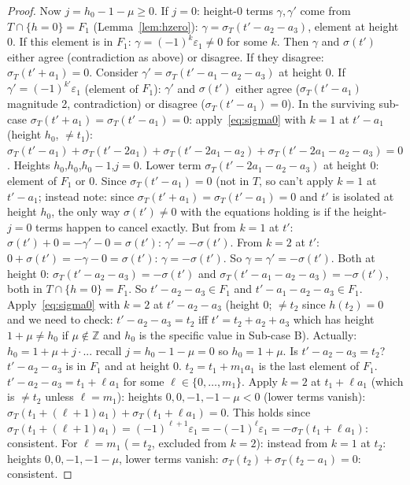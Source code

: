 \documentclass{article}
\begin{document}
\begin{proof}
Now $j=h_0-1-\mu\ge 0$.  If $j=0$: height-$0$ terms $\gamma,\gamma'$ come from $T\cap\{h=0\}=F_1$ (Lemma~\ref{lem:hzero}):
$\gamma=\sigma_T(t'-a_2-a_3)$, element at height $0$.  If this element is in $F_1$: $\gamma=(-1)^k\varepsilon_1\ne 0$ for some $k$.
Then $\gamma$ and $\sigma(t')$ either agree (contradiction as above) or disagree.
If they disagree: $\sigma_T(t'+a_1)=0$.  Consider $\gamma'=\sigma_T(t'-a_1-a_2-a_3)$ at height $0$.
If $\gamma'=(-1)^{k'}\varepsilon_1$ (element of $F_1$): $\gamma'$ and $\sigma(t')$ either agree ($\sigma_T(t'-a_1)$ magnitude 2, contradiction) or disagree ($\sigma_T(t'-a_1)=0$).
In the surviving sub-case $\sigma_T(t'+a_1)=\sigma_T(t'-a_1)=0$:
apply~\eqref{eq:sigma0} with $k=1$ at $t'-a_1$ (height $h_0$, $\ne t_1$):
$\sigma_T(t'-a_1)+\sigma_T(t'-2a_1)+\sigma_T(t'-2a_1-a_2)+\sigma_T(t'-2a_1-a_2-a_3)=0$.
Heights $h_0$,$h_0$,$h_0-1$,$j=0$.
Lower term $\sigma_T(t'-2a_1-a_2-a_3)$ at height $0$: element of $F_1$ or $0$.
Since $\sigma_T(t'-a_1)=0$ (not in $T$, so can't apply $k=1$ at $t'-a_1$; instead note: since
$\sigma_T(t'+a_1)=\sigma_T(t'-a_1)=0$ and $t'$ is isolated at height $h_0$, the only way
$\sigma(t')\ne 0$ with the equations holding is if the height-$j=0$ terms happen to cancel exactly.
But from $k=1$ at $t'$: $\sigma(t')+0 = -\gamma'-0 = \sigma(t')$: $\gamma'=-\sigma(t')$.
From $k=2$ at $t'$: $0+\sigma(t')=-\gamma-0=\sigma(t')$: $\gamma=-\sigma(t')$.
So $\gamma=\gamma'=-\sigma(t')$.  Both at height $0$: $\sigma_T(t'-a_2-a_3)=-\sigma(t')$ and
$\sigma_T(t'-a_1-a_2-a_3)=-\sigma(t')$, both in $T\cap\{h=0\}=F_1$.
So $t'-a_2-a_3\in F_1$ and $t'-a_1-a_2-a_3\in F_1$.
Apply~\eqref{eq:sigma0} with $k=2$ at $t'-a_2-a_3$ (height $0$; $\ne t_2$ since $h(t_2)=0$
and we need to check: $t'-a_2-a_3=t_2$ iff $t'=t_2+a_2+a_3$ which has height $1+\mu\ne h_0$ if $\mu\notin\mathbb{Z}$ and $h_0$ is the specific value in Sub-case B).
Actually: $h_0=1+\mu+j\cdot$... recall $j=h_0-1-\mu=0$ so $h_0=1+\mu$.
Is $t'-a_2-a_3=t_2$?  $t'-a_2-a_3$ is in $F_1$ and at height $0$.
$t_2=t_1+m_1a_1$ is the last element of $F_1$.
$t'-a_2-a_3=t_1+\ell a_1$ for some $\ell\in\{0,\dots,m_1\}$.
Apply $k=2$ at $t_1+\ell a_1$ (which is $\ne t_2$ unless $\ell=m_1$):
heights $0,0,-1,-1-\mu<0$ (lower terms vanish):
$\sigma_T(t_1+(\ell+1)a_1)+\sigma_T(t_1+\ell a_1)=0$.
This holds since $\sigma_T(t_1+(\ell+1)a_1)=(-1)^{\ell+1}\varepsilon_1=-(-1)^\ell\varepsilon_1=-\sigma_T(t_1+\ell a_1)$: consistent.
For $\ell=m_1$ ($=t_2$, excluded from $k=2$): instead from $k=1$ at $t_2$:
heights $0,0,-1,-1-\mu$, lower terms vanish: $\sigma_T(t_2)+\sigma_T(t_2-a_1)=0$: consistent.


\end{proof}
\end{document}
